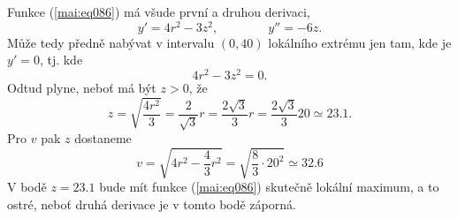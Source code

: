 \begin{mdframed}[style=mdexam]
\begin{example}
    Funkce (\ref{mai:eq086}) má všude první a druhou derivaci,
    \begin{equation*}
        y' = 4r^2 - 3z^2, \qquad\qquad y'' = -6z.
    \end{equation*}
    Může tedy předně nabývat v intervalu \((0, 40)\) lokálního extrému jen tam, kde je \(y'=0\), tj.
    kde
    \begin{equation*}
        4r^2 - 3z^2 = 0.
    \end{equation*}
    Odtud plyne, neboť má být \(z > 0\), že
    \begin{equation*}
        z = \sqrt{\dfrac{4r^2}{3}} = \dfrac{2}{\sqrt{3}}r = \dfrac{2\sqrt{3}}{3}r = 
            \dfrac{2\sqrt{3}}{3}20 \simeq \num{23.1}.
    \end{equation*}
    Pro \(v\) pak \(z\) dostaneme
    \begin{equation*}
        v = \sqrt{4r^2 - \dfrac{4}{3}r^2} = \sqrt{\frac{8}{3}\cdot20^2}\simeq\num{32.6}
    \end{equation*}
    V bodě \(z = \num{23.1}\) bude mít funkce (\ref{mai:eq086}) skutečně lokální maximum, a to
    ostré, neboť druhá derivace je v tomto bodě záporná.
  \end{example}
\end{mdframed}